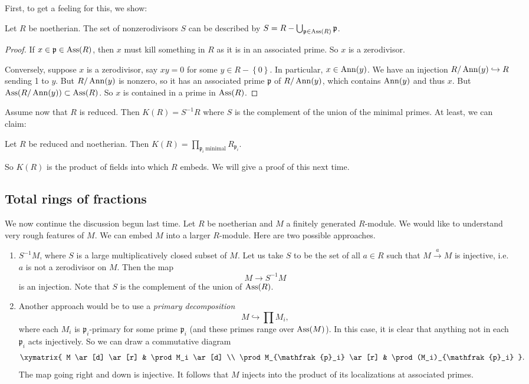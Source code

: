 First, to get a feeling for this, we show:

\begin{proposition} Let $R$ be noetherian. The set of nonzerodivisors $S$
can be described by
$S = R- \bigcup_{\mathfrak{p} \in \operatorname{Ass}(R)} \mathfrak{p}$.
\end{proposition}
\begin{proof}
If $x \in\mathfrak{p} \in \operatorname{Ass}(R)$, then $x$ must kill something in $R$ as it
is in an associated prime.	So $x$ is a zerodivisor.

Conversely, suppose $x$ is a zerodivisor, say $xy = 0$ for some $y \in R -
\left\{0\right\}$. In
particular, $x \in \operatorname{Ann}(y)$. We have an injection $R/\operatorname{Ann}(y) \hookrightarrow R$
sending 1 to $y$. But $R/\operatorname{Ann}(y)$ is nonzero, so it has an associated prime
$\mathfrak{p}$ of $R/\operatorname{Ann}(y)$, which contains $\operatorname{Ann}(y)$ and thus $x$. But
$\operatorname{Ass}(R/\operatorname{Ann}(y)) \subset \operatorname{Ass}(R)$.
So $x$ is contained in a prime in $\operatorname{Ass}(R)$.
\end{proof}

Assume now that $R$ is reduced.  Then $K(R)  = S^{-1}R$ where $S$ is the
complement of the union of the minimal primes.
At least, we can claim:

\begin{proposition} Let $R$ be reduced and noetherian. Then
$K(R) = \prod_{\mathfrak{p}_i \ \mathrm{minimal}} R_{\mathfrak{p}_i}$.
\end{proposition}

So $K(R)$ is the product of fields into which $R$ embeds.
We will give a proof of this next time.
\subsection{Total rings of fractions}

We now continue the discussion begun last time. Let $R$ be noetherian and $M$ a
finitely generated $R$-module. We would like to understand very rough features
of $M$.
We can embed $M$ into a larger $R$-module.
Here are two possible approaches.

\begin{enumerate}
\item  $S^{-1}M$, where $S$ is a large multiplicatively closed subset of $M$.
Let us take $S $ to be the set of all $a \in R$ such that $M
\stackrel{a}{\to}M$ is injective, i.e. $a$ is not a zerodivisor on $M$. Then
the map
\[ M \to S^{-1}M  \]
is an injection. Note that $S$ is the complement of the union of $\operatorname{Ass}(R)$.
\item Another approach would be to use a \emph{primary decomposition}
\[ M \hookrightarrow \prod M_i,  \]
where each $M_i$ is $\mathfrak{p}_i$-primary for some prime $\mathfrak{p}_i$
(and these primes range over $\operatorname{Ass}(M)$). In this case, it is clear that
anything not in each $\mathfrak{p}_i$ acts injectively. So we can draw a
commutative diagram
\[
\xymatrix{
M \ar[d]  \ar[r] &  \prod M_i \ar[d]  \\
\prod M_{\mathfrak{p}_i} \ar[r] &  \prod (M_i)_{\mathfrak{p}_i}
}.
\]
The map going right and down is injective.
It follows that $M$ injects into the product of its localizations at associated
primes.
\end{enumerate}

